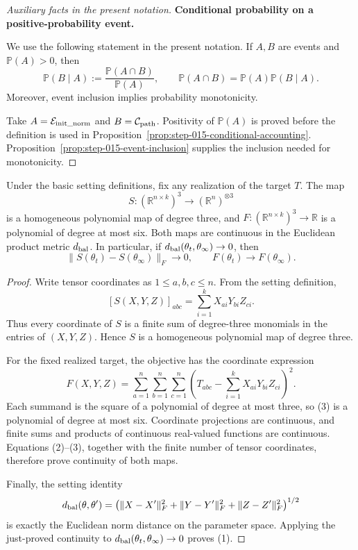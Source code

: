 \begin{proof}[Auxiliary facts in the present notation]
\medskip\noindent\textbf{Conditional probability on a positive-probability event.}\par

We use the following statement in the present notation. If \(A,B\) are events and \(\mathbb P(A)>0\), then
\[
  \mathbb P(B\mid A):=\frac{\mathbb P(A\cap B)}{\mathbb P(A)},
  \qquad
  \mathbb P(A\cap B)=\mathbb P(A)\mathbb P(B\mid A).
\]
Moreover, event inclusion implies probability monotonicity.

Take
\(A=\mathcal E_{\rm init\_norm}\) and
\(B=\mathcal C_{\rm path}\). Positivity of \(\mathbb P(A)\) is proved
before the definition is used in
Proposition~\ref{prop:step-015-conditional-accounting}. Proposition~\ref{prop:step-015-event-inclusion}
supplies the inclusion needed for monotonicity.

\end{proof}



\begin{proposition}
\label{prop:step-015-polynomial-continuity}
Under the basic setting definitions, fix any realization of the target
\(T\). The map
\[
  S:(\mathbb R^{n\times k})^3\longrightarrow
    (\mathbb R^n)^{\otimes3}
\]
is a homogeneous polynomial map of degree three, and
\(F:(\mathbb R^{n\times k})^3\to\mathbb R\) is a polynomial of degree at
most six. Both maps are continuous in the Euclidean product metric
\(d_{\rm bal}\). In particular, if
\(d_{\rm bal}(\theta_t,\theta_\infty)\to0\), then
\[
  \|S(\theta_t)-S(\theta_\infty)\|_F\to0,
  \qquad
  F(\theta_t)\to F(\theta_\infty).                       \tag{1}
\]

\end{proposition}

\begin{proof}
Write tensor coordinates as
\(1\le a,b,c\le n\). From the setting definition,
\[
  [S(X,Y,Z)]_{abc}
  =\sum_{i=1}^k X_{ai}Y_{bi}Z_{ci}.                     \tag{2}
\]
Thus every coordinate of \(S\) is a finite sum of degree-three monomials in
the entries of \((X,Y,Z)\). Hence \(S\) is a homogeneous polynomial map of
degree three.

For the fixed realized target, the objective has the coordinate expression
\[
  F(X,Y,Z)
  =\sum_{a=1}^n\sum_{b=1}^n\sum_{c=1}^n
    \left(T_{abc}-\sum_{i=1}^kX_{ai}Y_{bi}Z_{ci}\right)^2. \tag{3}
\]
Each summand is the square of a polynomial of degree at most three, so (3) is
a polynomial of degree at most six. Coordinate projections are continuous,
and finite sums and products of continuous real-valued functions are
continuous. Equations (2)--(3), together with the finite number of tensor
coordinates, therefore prove continuity of both maps.

Finally, the setting identity
\[
  d_{\rm bal}(\theta,\theta')
  =\bigl(\|X-X'\|_F^2+\|Y-Y'\|_F^2+\|Z-Z'\|_F^2\bigr)^{1/2}
\]
is exactly the Euclidean norm distance on the parameter space. Applying the
just-proved continuity to
\(d_{\rm bal}(\theta_t,\theta_\infty)\to0\) proves (1).


\end{proof}


